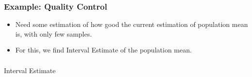 %
%
%
%
%
%
%
%
%
%
%
%
%
%

\begin{frame}[fragile]\frametitle{Example: Quality Control}
\begin{itemize}
\item Need some estimation of how good the current estimation of population mean is, with only few samples.
\item For this, we find Interval Estimate of the population mean.
\end{itemize}
\end{frame}
%
\begin{frame}[fragile]\frametitle{}
\begin{center}
{\Large Interval Estimate}
\end{center}
\end{frame}


